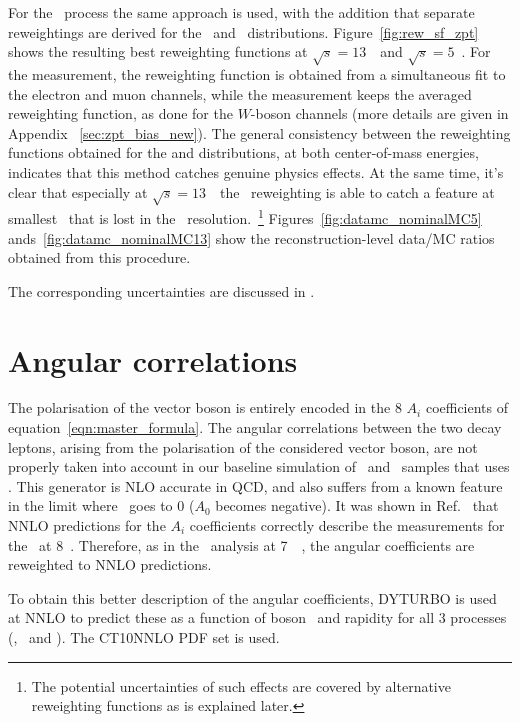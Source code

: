 For the \Zboson\ process the same approach is used, with the addition that separate reweightings are derived for the \ptdilep\ and \ut\ distributions.  Figure~\ref{fig:rew_sf_zpt} shows the resulting best reweighting functions at $\sqrt{s} = 13$~\TeV\ and $\sqrt{s} = 5$~\TeV. For the \ut measurement, the reweighting function is obtained from a simultaneous fit to the electron and muon channels, while  the \ptdilep measurement keeps the averaged reweighting function, as done for the $W$-boson channels (more details are given in Appendix ~\ref{sec:zpt_bias_new}). The general consistency between the reweighting functions obtained for the \ut and \ptdilep distributions, at both center-of-mass energies, indicates that this method catches genuine physics effects. At the same time, it's clear that especially at $\sqrt{s} = 13$~\TeV\ the \ptdilep\ reweighting is able to catch a feature at smallest \pT\ that is lost in the \ut\ resolution.~\footnote{The potential uncertainties of such effects are covered by alternative reweighting functions as is explained later.} Figures~\ref{fig:datamc_nominalMC5} ands~\ref{fig:datamc_nominalMC13} show the reconstruction-level data/MC ratios obtained from this procedure.


The corresponding uncertainties are discussed in .


\section{Angular correlations}

The polarisation of the vector boson is entirely encoded in the 8
$A_i$ coefficients of equation~\ref{eqn:master_formula}.  The angular
correlations between the two decay leptons, arising from the
polarisation of the considered vector boson, are not properly taken
into account in our baseline simulation of \Wboson\ and \Zboson\
samples that uses \PowPythia.  This generator is NLO accurate in QCD,
and also suffers from a known feature in the limit where \pttruthv\
goes to 0 ($A_0$ becomes negative). It was shown in
Ref.~\cite{STDM-2014-10} that NNLO predictions for the $A_i$
coefficients correctly describe the measurements for the \Zboson\
at 8~\TeV. Therefore, as in the \mW\ analysis at
7~\TeV~\cite{STDM-2014-18}, the angular coefficients are reweighted
to NNLO predictions.

To obtain this better description of the angular coefficients, DYTURBO is used at NNLO to predict these as a function of boson \pt\ and rapidity for all 3 processes (\Wplus, \Wminus\ and \Zboson). The CT10NNLO PDF set is used.

